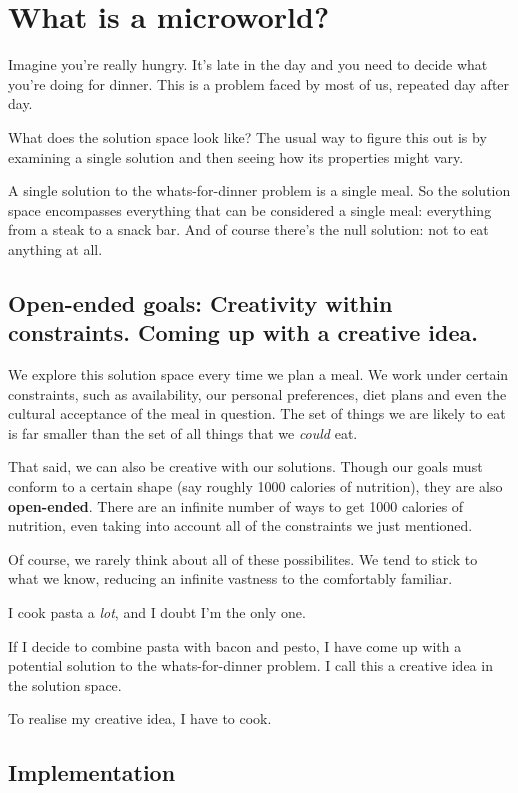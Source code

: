 \section{What is a microworld?}

Imagine you're really hungry. It's late in the day and you need to
decide what you're doing for dinner. This is a problem faced by most of
us, repeated day after day.

What does the solution space look like? The usual way to figure this out
is by examining a single solution and then seeing how its properties
might vary.

A single solution to the whats-for-dinner problem is a single meal. So
the solution space encompasses everything that can be considered a
single meal: everything from a steak to a snack bar. And of course
there's the null solution: not to eat anything at all.

\subsection{Open-ended goals: Creativity within constraints. Coming up
with a \textbf{creative idea}.}

We explore this solution space every time we plan a meal. We work under
certain constraints, such as availability, our personal preferences,
diet plans and even the cultural acceptance of the meal in question. The
set of things we are likely to eat is far smaller than the set of all
things that we \emph{could} eat.

That said, we can also be creative with our solutions. Though our goals
must conform to a certain shape (say roughly 1000 calories of
nutrition), they are also \textbf{open-ended}. There are an infinite
number of ways to get 1000 calories of nutrition, even taking into
account all of the constraints we just mentioned.

Of course, we rarely think about all of these possibilites. We tend to
stick to what we know, reducing an infinite vastness to the comfortably
familiar.

I cook pasta a \emph{lot}, and I doubt I'm the only one.

If I decide to combine pasta with bacon and pesto, I have come up with a
potential solution to the whats-for-dinner problem. I call this a
creative idea in the solution space.

To realise my creative idea, I have to cook.

\subsection{Implementation}

